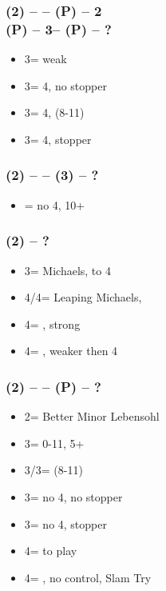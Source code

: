 \subsubsection*{(2\hearts) -- \dbl -- (P) -- 2\nt \\
                (P) -- 3\mins -- (P) -- ?}
\begin{itemize}
    \item 3\diams = weak
    \item 3\hearts = 4\spades, no \hearts stopper
    \item 3\spades = 4\spades, \inv (8-11) \imp
    \item 3\nt = 4\spades, \hearts stopper
\end{itemize}

\subsubsection*{(2\hearts) -- \dbl -- (3\hearts) -- ?}
\begin{itemize}
    \item \dbl = no 4\spades, 10+
\end{itemize}

\subsubsection*{(2\spades) -- ?}
\begin{itemize}
    \item 3\spades = Michaels, \ftwon to 4
    \item 4\clubs/4\diams = Leaping Michaels, \gf
    \item 4\spades = \minor, strong
    \item 4\nt = \minor, weaker then 4\hearts
\end{itemize}

\subsubsection*{(2\spades) -- \dbl -- (P) -- ?}
\begin{itemize}
    \item 2\nt = Better Minor Lebensohl
    \item 3\clubs = 0-11, 5+\clubs
    \item 3\diams/3\hearts = \inv (8-11)
    \item 3\spades = no 4\hearts, no \spades stopper
    \item 3\nt = no 4\hearts, \spades stopper
    \item 4\hearts = to play
    \item 4\hearts = \minor, no \spades control, Slam Try
\end{itemize}


